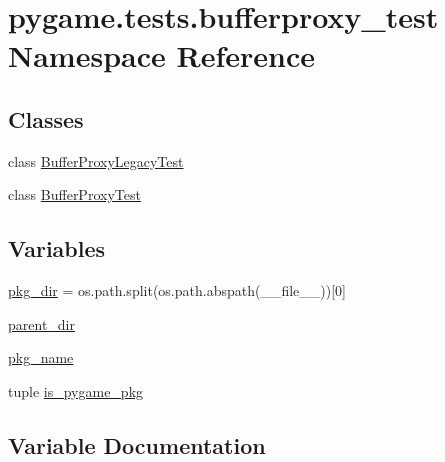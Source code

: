 \hypertarget{namespacepygame_1_1tests_1_1bufferproxy__test}{}\section{pygame.\+tests.\+bufferproxy\+\_\+test Namespace Reference}
\label{namespacepygame_1_1tests_1_1bufferproxy__test}
\subsection*{Classes}
\begin{DoxyCompactItemize}
\item 
class \hyperlink{classpygame_1_1tests_1_1bufferproxy__test_1_1_buffer_proxy_legacy_test}{Buffer\+Proxy\+Legacy\+Test}
\item 
class \hyperlink{classpygame_1_1tests_1_1bufferproxy__test_1_1_buffer_proxy_test}{Buffer\+Proxy\+Test}
\end{DoxyCompactItemize}
\subsection*{Variables}
\begin{DoxyCompactItemize}
\item 
\hyperlink{namespacepygame_1_1tests_1_1bufferproxy__test_a2ab974bf3c012452f543923356ef3b1c}{pkg\+\_\+dir} = os.\+path.\+split(os.\+path.\+abspath(\+\_\+\+\_\+file\+\_\+\+\_\+))\mbox{[}0\mbox{]}
\item 
\hyperlink{namespacepygame_1_1tests_1_1bufferproxy__test_aa0aeeb022f61cbd9fc7f418d3db075a7}{parent\+\_\+dir}
\item 
\hyperlink{namespacepygame_1_1tests_1_1bufferproxy__test_aa3ec0a8db70ba42d1eae7296ca8888df}{pkg\+\_\+name}
\item 
tuple \hyperlink{namespacepygame_1_1tests_1_1bufferproxy__test_ab79e5eee42239fb67d42b13b5dd89f9b}{is\+\_\+pygame\+\_\+pkg}
\end{DoxyCompactItemize}


\subsection{Variable Documentation}
\mbox{\label{namespacepygame_1_1tests_1_1bufferproxy__test_ab79e5eee42239fb67d42b13b5dd89f9b}} 
